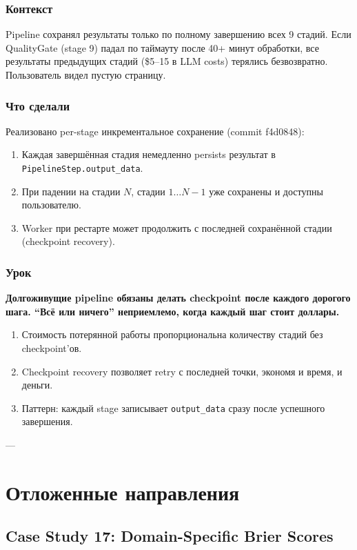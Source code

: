 \subsubsection*{Контекст}
Pipeline сохранял результаты только по полному завершению всех 9 стадий. Если QualityGate (stage 9) падал по таймауту после 40+ минут обработки, все результаты предыдущих стадий (\$5--15 в LLM costs) терялись безвозвратно. Пользователь видел пустую страницу.

\subsubsection*{Что сделали}
Реализовано per-stage инкрементальное сохранение (commit f4d0848):

\begin{enumerate}
\item Каждая завершённая стадия немедленно persists результат в \texttt{PipelineStep.output\_data}.
\item При падении на стадии $N$, стадии $1 \ldots N{-}1$ уже сохранены и доступны пользователю.
\item Worker при рестарте может продолжить с последней сохранённой стадии (checkpoint recovery).
\end{enumerate}

\subsubsection*{Урок}
\textbf{Долгоживущие pipeline обязаны делать checkpoint после каждого дорогого шага. ``Всё или ничего'' неприемлемо, когда каждый шаг стоит доллары.}

\begin{enumerate}
\item Стоимость потерянной работы пропорциональна количеству стадий без checkpoint'ов.
\item Checkpoint recovery позволяет retry с последней точки, экономя и время, и деньги.
\item Паттерн: каждый stage записывает \texttt{output\_data} сразу после успешного завершения.
\end{enumerate}

---

\section{Отложенные направления}

\subsection{Case Study 17: Domain-Specific Brier Scores}

